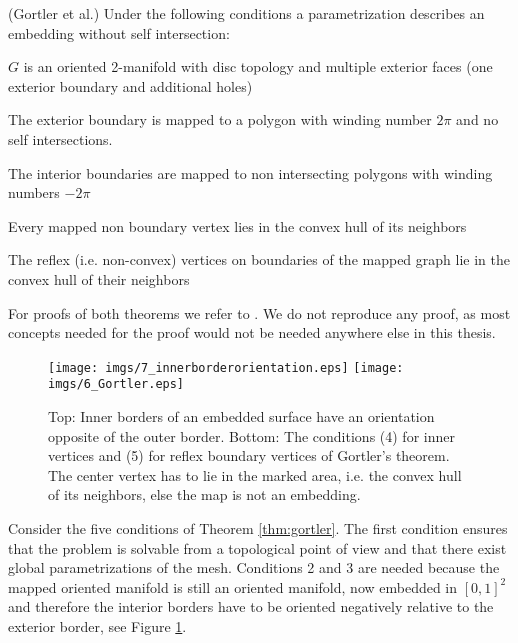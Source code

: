 \begin{thm}\label{thm:gortler}(Gortler et al.) Under the following conditions a parametrization describes an embedding without self intersection:
\begin{packed_enum}
\item $G$ is an oriented 2-manifold with disc topology and multiple exterior faces (one exterior boundary and additional holes)
\item The exterior boundary is mapped to a polygon with winding number $2\pi$ and no self intersections.
\item The interior boundaries are mapped to non intersecting polygons with winding numbers $-2\pi$
\item Every mapped non boundary vertex lies in the convex hull of its neighbors
\item The reflex (i.e. non-convex) vertices on boundaries of the mapped graph lie in the convex hull of their neighbors
\end{packed_enum}
\end{thm}
For proofs of both theorems we refer to \cite{Gortler}. We do not reproduce any proof, as most concepts needed for the proof would not be needed anywhere else in this thesis.


\begin{figure}%
\begin{center}
\texttt{[image: imgs/7\_innerborderorientation.eps]}%
\vspace{0.5cm}
\texttt{[image: imgs/6\_Gortler.eps]}%
\end{center}

\caption{Top: Inner borders of an embedded surface have an orientation opposite of the outer border. Bottom: The conditions (4) for inner vertices and (5) for reflex boundary vertices of Gortler's theorem. The center vertex has to lie in the marked area, i.e. the convex hull of its neighbors, else the map is not an embedding.}%
\label{fig:7_gortler}%
\end{figure}

Consider the five conditions of Theorem \ref{thm:gortler}. The first condition ensures that the problem is solvable from a topological point of view and that there exist global parametrizations of the mesh. Conditions 2 and 3 are needed because the mapped oriented manifold is still an oriented manifold, now embedded in $[0,1]^2$ and therefore the interior borders  have to be oriented negatively relative to the exterior border, see Figure \ref{fig:7_gortler}. 

